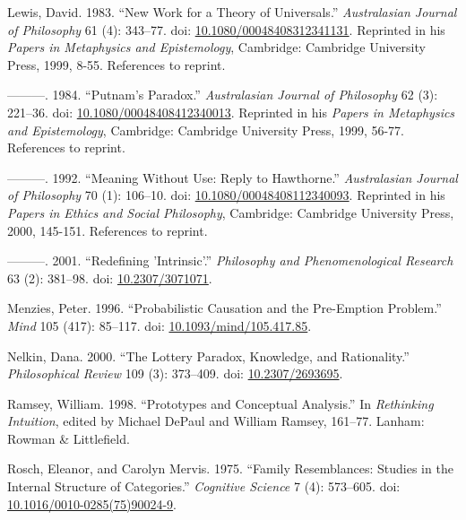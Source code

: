 \documentclass[
  11pt,
  letterpaper,
  DIV=11,
  numbers=noendperiod,
  twoside]{scrartcl}
\newlength{\cslhangindent}
\newenvironment{CSLReferences}[2] %
 {\begin{list}{}{%
  \setlength{\itemindent}{0pt}
  \setlength{\leftmargin}{0pt}
  \setlength{\parsep}{0pt}
  \ifodd #1
   \setlength{\leftmargin}{\cslhangindent}
   \setlength{\itemindent}{-1\cslhangindent}
  \fi
  \setlength{\itemsep}{#2\baselineskip}}}
 {\end{list}}
\begin{document}
\begin{CSLReferences}{1}{0}
Lewis, David. 1983. {``New Work for a Theory of Universals.''}
\emph{Australasian Journal of Philosophy} 61 (4): 343--77. doi:
\href{https://doi.org/10.1080/00048408312341131}{10.1080/00048408312341131}.
Reprinted in his \emph{Papers in Metaphysics and Epistemology},
Cambridge: Cambridge University Press, 1999, 8-55. References to
reprint.

---------. 1984. {``Putnam's Paradox.''} \emph{Australasian Journal of
Philosophy} 62 (3): 221--36. doi:
\href{https://doi.org/10.1080/00048408412340013}{10.1080/00048408412340013}.
Reprinted in his \emph{Papers in Metaphysics and Epistemology},
Cambridge: Cambridge University Press, 1999, 56-77. References to
reprint.

---------. 1992. {``Meaning Without Use: Reply to {H}awthorne.''}
\emph{Australasian Journal of Philosophy} 70 (1): 106--10. doi:
\href{https://doi.org/10.1080/00048408112340093}{10.1080/00048408112340093}.
Reprinted in his \emph{Papers in Ethics and Social Philosophy},
Cambridge: Cambridge University Press, 2000, 145-151. References to
reprint.

---------. 2001. {``Redefining 'Intrinsic'.''} \emph{Philosophy and
Phenomenological Research} 63 (2): 381--98. doi:
\href{https://doi.org/10.2307/3071071}{10.2307/3071071}.

Menzies, Peter. 1996. {``Probabilistic Causation and the Pre-Emption
Problem.''} \emph{Mind} 105 (417): 85--117. doi:
\href{https://doi.org/10.1093/mind/105.417.85}{10.1093/mind/105.417.85}.

Nelkin, Dana. 2000. {``The Lottery Paradox, Knowledge, and
Rationality.''} \emph{Philosophical Review} 109 (3): 373--409. doi:
\href{https://doi.org/10.2307/2693695}{10.2307/2693695}.

Ramsey, William. 1998. {``Prototypes and Conceptual Analysis.''} In
\emph{Rethinking Intuition}, edited by Michael DePaul and William
Ramsey, 161--77. Lanham: Rowman \& Littlefield.

Rosch, Eleanor, and Carolyn Mervis. 1975. {``Family Resemblances:
Studies in the Internal Structure of Categories.''} \emph{Cognitive
Science} 7 (4): 573--605. doi:
\href{https://doi.org/10.1016/0010-0285(75)90024-9}{10.1016/0010-0285(75)90024-9}.


\end{CSLReferences}
\end{document}
